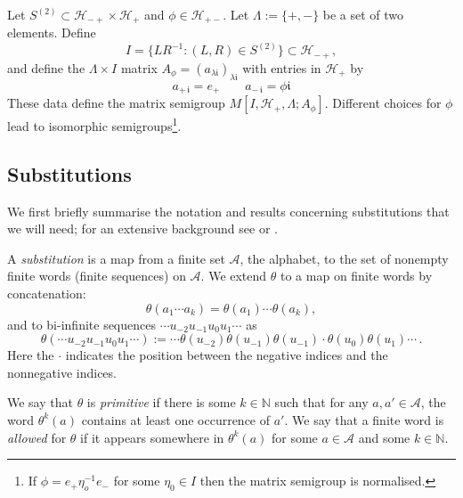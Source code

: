 \documentclass[12pt]{amsart}
\theoremstyle{definition}
\numberwithin{equation}{section}
\newcommand{\N}{\mathbb N}
\newcommand{\tcb}{\textcolor{blue}}
\newcommand{\ii}{{\mathfrak i}}
\newcommand{\Aa}{{\mathcal A}}
\newcommand{\Hh}{{\mathcal H}}
\begin{document}
Let $S^{(2)}\subset \Hh_{-+}\times \Hh_{+}$ and $\phi\in \Hh_{+-}$. Let $\Lambda := \{+,-\}$ be a set of two elements. Define
\begin{equation}\label{eq:r-set}I = \{LR^{-1}:(L,R) \in S^{(2)}\}\subset \Hh_{-+},\end{equation}
and  define the $\Lambda\times I$ matrix $A_\phi=(a_{\lambda \ii})_{\lambda \ii}$ with entries in $\Hh_+$ by 
\begin{equation}\label{eq:matrix} a_{+\,\ii} = e_+ \qquad a_{-\,\ii} = \phi \ii \end{equation}
These data define the matrix semigroup $M[I,\Hh_{+},\Lambda;A_\phi]$. 
Different choices for $\phi$ lead to isomorphic semigroups\footnote{If $\phi=e_+\eta_o^{-1} e_-$ for some $\eta_0\in I$ then the matrix semigroup is normalised.}.


\subsection{Substitutions}\label{sec:substitutions}

We first briefly summarise the notation and results concerning substitutions that we will need; for an extensive background see \cite{Baake-Grimm} or \cite{Pytheas-Fogg}.


A  {\em substitution} is a map from a finite set $\mathcal A$, the alphabet, to the set of 
nonempty finite words (finite sequences) on $\mathcal A$. We extend $\theta$ to a map on finite words by concatenation: 
\begin{equation}\label{eq-concat}\theta(a_1\cdots a_k) = \theta(a_1)\cdots \theta(a_k),
\end{equation}
and to bi-infinite sequences $\cdots u_{-2} u_{-1} u_0 u_1 \cdots$  as  
\[\theta   (\cdots u_{-2} u_{-1} u_0 u_1 \cdots ) :=   \cdots \theta (u_{-2}) \theta (  u_{-1}    ) \theta  (u_{-1})\cdot   \theta (     u_{0})  \theta (    u_{1}) \cdots \, .\]
Here the $\cdot$ indicates the position between the negative indices and the nonnegative indices. 

We say that $\theta$ is {\em primitive} if there is some 
$k\in \N$ such that for any $a,a'\in \mathcal A$,
the word $\theta^k(a)$ contains at least one  occurrence of $a'$. 
We say that a finite word is {\em allowed} for $\theta$ if it appears somewhere in $\theta^k(a)$ for some $a\in \Aa$ and some  $k\in\N$. 
\end{document}
